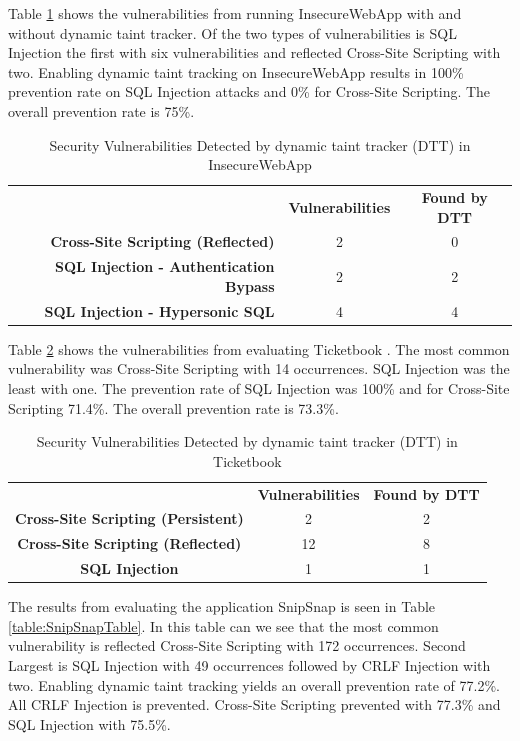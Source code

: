 Table \ref{table:InsecureTable} shows the vulnerabilities from running InsecureWebApp \parencite{insecure} with and without dynamic taint tracker. Of the two types of vulnerabilities is SQL Injection the first with six vulnerabilities and reflected Cross-Site Scripting with two. Enabling dynamic taint tracking on InsecureWebApp \parencite{insecure} results in 100\% prevention rate on SQL Injection attacks and 0\% for Cross-Site Scripting. The overall prevention rate is 75\%. 

\begin{table}[H]
  \centering
  \caption{Security Vulnerabilities Detected by dynamic taint tracker (DTT) in InsecureWebApp}
  \label{table:InsecureTable}
    \begin{tabular}{rcc}
      & \textbf{Vulnerabilities} & \textbf{Found by DTT} \\
      \textbf{Cross-Site Scripting (Reflected)}      & 2             & 0  \\
      \textbf{SQL Injection - Authentication Bypass} & 2             & 2  \\
      \textbf{SQL Injection - Hypersonic SQL}        & 4             & 4  
    \end{tabular}
\end{table}

Table \ref{table:Ticketbook} shows the vulnerabilities from evaluating Ticketbook \parencite{ticketbook}. The most common vulnerability was Cross-Site Scripting with 14 occurrences. SQL Injection was the least with one. The prevention rate of SQL Injection was 100\% and for Cross-Site Scripting 71.4\%. The overall prevention rate is 73.3\%.

\begin{table}[H]
  \centering
  \caption{Security Vulnerabilities Detected by dynamic taint tracker (DTT) in Ticketbook}
  \label{table:Ticketbook}
  \begin{tabular}{ccc}
    & \textbf{Vulnerabilities} & \textbf{Found by DTT} \\
    \textbf{Cross-Site Scripting (Persistent)} & 2             & 2 \\
    \textbf{Cross-Site Scripting (Reflected)}  & 12            & 8 \\
    \textbf{SQL Injection}                     & 1             & 1
  \end{tabular}
\end{table}

The results from evaluating the application SnipSnap \parencite{snipsnap} is seen in Table \ref{table:SnipSnapTable}. In this table can we see that the most common vulnerability is reflected Cross-Site Scripting with 172 occurrences. Second Largest is SQL Injection with 49 occurrences followed by CRLF Injection with two. Enabling dynamic taint tracking yields an overall prevention rate of 77.2\%. All CRLF Injection is prevented. Cross-Site Scripting prevented with 77.3\% and SQL Injection with 75.5\%.

